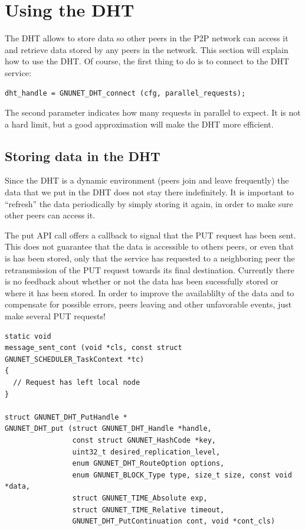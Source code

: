 \documentclass[10pt]{article}
\begin{document}
\section{Using the DHT}

The DHT allows to store data so other peers in the P2P network can
access it and retrieve data stored by any peers in the network.
This section will explain how to use the DHT. Of course, the first
thing to do is to connect to the DHT service:
\lstset{language=C}
\begin{lstlisting}
dht_handle = GNUNET_DHT_connect (cfg, parallel_requests);
\end{lstlisting}
The second parameter indicates how many requests in parallel to expect.
It is not a hard limit, but a good approximation will make the DHT more
efficient.

\subsection{Storing data in the DHT}
Since the DHT is a dynamic environment (peers join and leave frequently)
the data that we put in the DHT does not stay there indefinitely. It is
important to ``refresh'' the data periodically by simply storing it again,
in order to make sure other peers can access it.

The put API call offers a callback to signal that the PUT request has been
sent. This does not guarantee that the data is accessible to others peers,
or even that is has been stored, only that the service has requested to
a neighboring peer the retransmission of the PUT request towards its final
destination. Currently there is no feedback about whether or not the data
has been sucessfully stored or where it has been stored. In order to improve
the availablilty of the data and to compensate for possible errors, peers leaving
and other unfavorable events, just make several PUT requests!

\lstset{language=C}
\begin{lstlisting}
static void
message_sent_cont (void *cls, const struct GNUNET_SCHEDULER_TaskContext *tc)
{
  // Request has left local node
}

struct GNUNET_DHT_PutHandle *
GNUNET_DHT_put (struct GNUNET_DHT_Handle *handle,
                const struct GNUNET_HashCode *key,
                uint32_t desired_replication_level,
                enum GNUNET_DHT_RouteOption options,
                enum GNUNET_BLOCK_Type type, size_t size, const void *data,
                struct GNUNET_TIME_Absolute exp,
                struct GNUNET_TIME_Relative timeout,
                GNUNET_DHT_PutContinuation cont, void *cont_cls)
\end{lstlisting}
\end{document}
